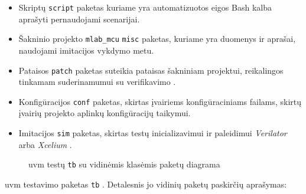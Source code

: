 \begin{itemize}
	\item Skriptų \texttt{script} paketas kuriame yra automatizuotos eigos Bash kalba aprašyti pernaudojami  scenarijai.

	\item Šakninio projekto \texttt{mlab\_mcu} \texttt{misc} paketas, kuriame yra duomenys ir aprašai, naudojami imitacijos vykdymo metu.

	\item Pataisos \texttt{patch} paketas suteikia pataisas šakniniam projektui, reikalingos tinkamam suderinamumui su verifikavimo .

	\item Konfigūracijos \texttt{conf} paketas, skirtas įvairiems konfigūraciniams failams, skirtų įvairių projekto aplinkų konfigūracijų taikymui.

	\item Imitacijos \texttt{sim}  paketas, skirtas testų inicializavimui ir paleidimui \textit{Verilator} arba \textit{Xcelium} .
\end{itemize}

\begin{figure}[H]
	
	\caption{\gls{uvm} testų \texttt{tb} su vidinėmis klasėmis paketų diagrama}
	\label{fig:uml_package_tb}
\end{figure}

\gls{uvm} testavimo paketas \texttt{tb} \pav{\ref{fig:uml_package_tb}}. Detalesnis jo vidinių paketų paskirčių aprašymas:

